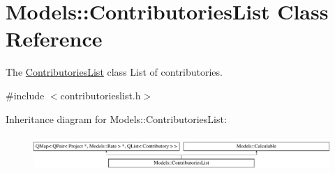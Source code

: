 \hypertarget{classModels_1_1ContributoriesList}{\section{Models\-:\-:Contributories\-List Class Reference}
\label{classModels_1_1ContributoriesList}
}


The \hyperlink{classModels_1_1ContributoriesList}{Contributories\-List} class List of contributories.  




{\ttfamily \#include $<$contributorieslist.\-h$>$}

Inheritance diagram for Models\-:\-:Contributories\-List\-:\begin{figure}[H]
\begin{center}
\leavevmode
\includegraphics[height=1.355932cm]{d7/d6a/classModels_1_1ContributoriesList}
\end{center}
\end{figure}
